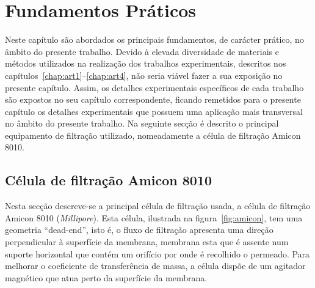 \chapter{Fundamentos Práticos} %
\label{cha:pra}
Neste capítulo são abordados os principais fundamentos, de carácter prático, no âmbito do presente trabalho. Devido à elevada diversidade de materiais e métodos utilizados na realização dos trabalhos experimentais, descritos nos capítulos~\ref{chap:art1}--\ref{chap:art4}, não seria viável fazer a sua exposição no presente capítulo. Assim, os detalhes experimentais específicos de cada trabalho são expostos no seu capítulo correspondente, ficando remetidos para o presente capítulo os detalhes experimentais que possuem uma aplicação mais transversal no âmbito do presente trabalho. Na seguinte secção é descrito o principal equipamento de filtração utilizado, nomeadamente a célula de filtração Amicon 8010.   

\section{Célula de filtração Amicon 8010} %
\label{sec:amicon}%
Nesta secção descreve-se a principal célula de filtração usada, a célula de filtração Amicon 8010 (\emph{Millipore}). Esta célula, ilustrada na figura~\ref{fig:amicon}, tem uma geometria ``dead-end'', isto é, o fluxo de filtração apresenta uma direção perpendicular à superfície da membrana, membrana esta que é assente num suporte horizontal que contém um orifício por onde é recolhido o permeado. Para melhorar o coeficiente de transferência de massa, a célula dispõe de um agitador magnético que atua perto da superfície da membrana. 

